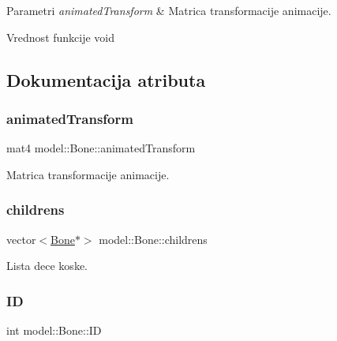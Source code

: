\begin{DoxyParams}{Parametri}
{\em animated\+Transform} & Matrica transformacije animacije. \\
\hline
\end{DoxyParams}
\begin{DoxyReturn}{Vrednost funkcije}
void 
\end{DoxyReturn}


\subsection{Dokumentacija atributa}
\mbox{\label{classmodel_1_1Bone_a72f5c45330effbe7a68b7984fcf2250e}} 
\subsubsection{\texorpdfstring{animated\+Transform}{animatedTransform}}
{\footnotesize\ttfamily mat4 model\+::\+Bone\+::animated\+Transform\hspace{0.3cm}{\ttfamily [private]}}



Matrica transformacije animacije. 

\mbox{\label{classmodel_1_1Bone_a41f8eef1aa80ccb7bb47f6de93316cf7}} 
\subsubsection{\texorpdfstring{childrens}{childrens}}
{\footnotesize\ttfamily vector$<$\hyperlink{classmodel_1_1Bone}{Bone}$\ast$$>$ model\+::\+Bone\+::childrens\hspace{0.3cm}{\ttfamily [private]}}



Lista dece koske. 

\mbox{\label{classmodel_1_1Bone_a7a300f62a3d7ffdde6f31d55cdffa44e}} 
\subsubsection{\texorpdfstring{ID}{ID}}
{\footnotesize\ttfamily int model\+::\+Bone\+::\+ID\hspace{0.3cm}{\ttfamily [private]}}



